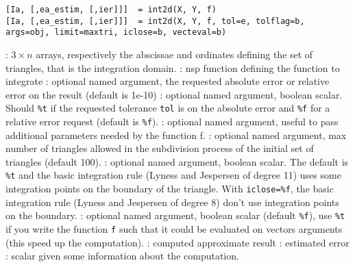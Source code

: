 
\begin{mandesc}
\end{mandesc}

\begin{calling_sequence}
\begin{verbatim}
[Ia, [,ea_estim, [,ier]]]  = int2d(X, Y, f)
[Ia, [,ea_estim, [,ier]]]  = int2d(X, Y, f, tol=e, tolflag=b, args=obj, limit=maxtri, iclose=b, vecteval=b)
\end{verbatim}
\end{calling_sequence}
\begin{parameters}
  \begin{varlist}
    :  $3 \times n$ arrays, respectively the abscissae and
    ordinates defining the set of triangles, that is the integration domain.
    : nsp function defining the function to integrate
    : optional named argument, the requested absolute error
                   or relative error on the result (default is 1e-10)
    : optional named argument, boolean scalar. Should
                       \verb+%t+ if the requested tolerance \verb+tol+ is on the absolute
                       error and \verb+%f+ for a relative error request
                      (default is \verb+%f+).
    : optional named argument, useful to pass
    additional parameters needed by the function f.
    : optional named argument, max number of
    triangles allowed in the subdivision process of the initial set of
    triangles (default 100).
    : optional named argument, boolean scalar. The
    default is \verb+%t+ and the basic integration rule (Lyness and 
    Jespersen of degree 11) uses some integration points on the
    boundary of the triangle. With \verb+iclose=%f+, the basic
    integration rule (Lyness and Jespersen of degree 8) don't
    use integration points on the boundary.
    : optional named argument, boolean scalar
    (default \verb+%f+), use \verb+%t+ if you write the function
                   \verb+f+ such that it could be evaluated on
                   vectors arguments (this speed up the computation).
    : computed approximate result
    : estimated error
    : scalar given some information about the computation.
  \end{varlist}
\end{parameters}

